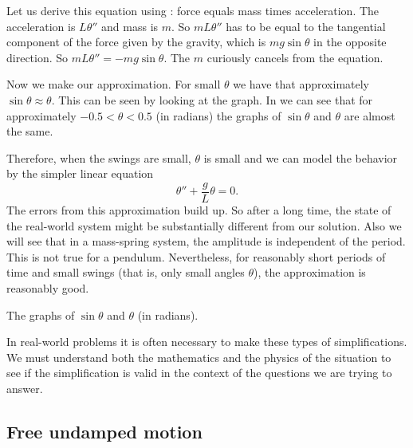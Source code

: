 \documentclass{ximera}
\begin{document}
Let us derive this equation using : force equals mass times acceleration.  The acceleration is $L \theta''$ and mass is $m$.  So $mL\theta''$ has to be equal to the tangential component of the force given by the gravity, which is $m g \sin \theta$ in the opposite direction. So $mL\theta'' = -mg \sin \theta$. The $m$ curiously cancels from the equation.

Now we make our approximation.  For small $\theta$ we have that approximately $\sin \theta \approx \theta$.  This can be seen by looking at the graph. In  we can see that for approximately $-0.5 < \theta < 0.5$ (in radians) the graphs of $\sin \theta$ and $\theta$ are almost the same.

Therefore, when the swings are small, $\theta$ is small and we can model the behavior by the simpler linear equation
\begin{equation*}
    \theta'' + \frac{g}{L} \theta = 0 .
\end{equation*}
The errors from this approximation build up. So after a long time, the state of the real-world system might be substantially different from our solution.  Also we will see that in a mass-spring system, the amplitude is independent of the period. This is not true for a pendulum.  Nevertheless, for reasonably short periods of time and small swings (that is, only small angles $\theta$), the approximation is reasonably good.

\begin{mywrapfig}{3.1in}
    \capstart
    \caption{The graphs of $\sin \theta$ and $\theta$ (in radians).\label{mv:sinthetafig}}
\end{mywrapfig}

In real-world problems it is often necessary to make these types of simplifications.  We must understand both the mathematics and the physics of the situation to see if the simplification is valid in the context of the questions we are trying to answer.

\subsection{Free undamped motion}
\end{document}
